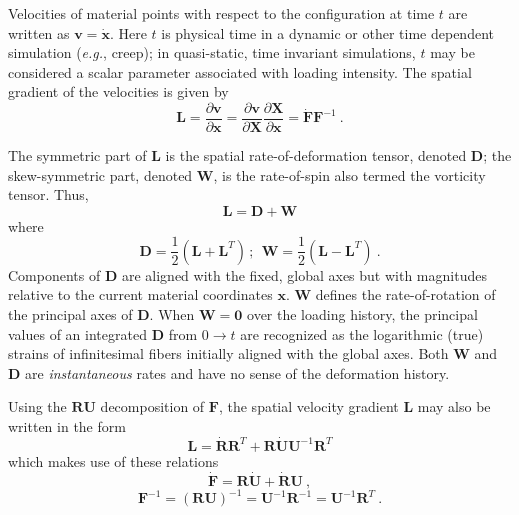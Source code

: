 \documentclass[11pt]{report}
\numberwithin{equation}{section}
\newcommand{\bmf } {\boldsymbol }  %
\newcommand{\eg}{\emph{e.g.},\xspace}
\newcommand{\ti}{\emph}
\newcommand{\nid}{\noindent}
\begin{document}
Velocities of material points with respect to the configuration at time $t$  are written as
$\bmf v = \dot{\bmf{x}}$. Here $t$ is physical time in a dynamic or other time dependent simulation
(\eg creep); in quasi-static, time invariant simulations, $t$ may be considered a scalar 
parameter associated with loading intensity. The spatial gradient of the velocities is given by
%
\begin{equation}\label{E:KSSMc}
\mathbf{L} = \frac{\partial \bmf{v}}{\partial \bmf{x}} = 
\frac{\partial \bmf{v}}{\partial \bmf{X}}\frac{\partial \bmf{X}}{\partial \bmf{x}}= 
\dot{ \mathbf{F}} \mathbf{F}^{-1}\ .
\end{equation}
%

The symmetric part of $\mathbf{L}$  is the spatial rate-of-deformation tensor, denoted
$\mathbf{D}$; the skew-symmetric part, denoted $\mathbf{W}$, is the rate-of-spin 
also termed the vorticity tensor. Thus,
%
\begin{equation}\label{E:KSSMd}
\mathbf{L = D + W}
\end{equation}
%
\nid where 
%
\begin{equation}\label{E:KSSMe}
\mathbf{D} = \frac{1}{2}\left ( \mathbf{L + L}^T \right)\,;\ \ 
\mathbf{W} = \frac{1}{2}\left ( \mathbf{L - L}^T \right)\ .
\end{equation}
%
\nid Components of $\mathbf{D}$ are aligned with the fixed, global axes
but with magnitudes relative to the current material coordinates $\bmf{x}$.
$\mathbf{W}$  defines the rate-of-rotation of the principal axes of $\mathbf{D}$.
When $\mathbf{W}=\mathbf{0}$ over the loading history, the
principal values of an integrated  $\mathbf{D}$ from $0\rightarrow t$
are recognized as the logarithmic (true) strains of infinitesimal fibers 
initially aligned with the global axes. Both $\mathbf{W}$  and $\mathbf{D}$  are
\ti{instantaneous} rates and have no sense of the deformation history. 

Using the $\mathbf{RU}$ decomposition of $\mathbf{F}$, the spatial velocity gradient
$\mathbf{L}$ may also be written in the form
%
\begin{equation}\label{E:KSSMf}
\mathbf{L} = \dot{\mathbf{R}}\mathbf{R}^T + 
\mathbf{R}\dot{\mathbf{U}} \mathbf{U}^{-1}\mathbf{R}^T
\end{equation}
%
\nid which makes use of these relations
\begin{equation}\label{E:KSSMg}
\dot{\mathbf{F}}= \mathbf{R} \dot{\mathbf{U}} + \dot{\mathbf{R}} \mathbf{U}\ ,
\end{equation}
%
\begin{equation}\label{E:KSSMh}
\mathbf{F}^{-1}= \left ( \mathbf{RU} \right )^{-1} = \mathbf{U}^{-1}\mathbf{R}^{-1}= 
\mathbf{U}^{-1}\mathbf{R}^T\ .
\end{equation}
%
  
\end{document}
